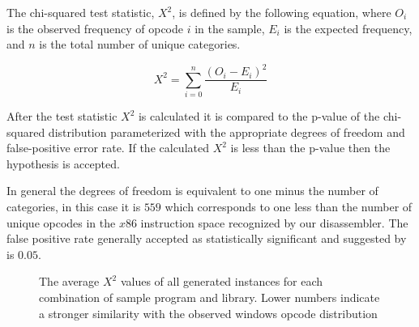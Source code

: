 
    The chi-squared test statistic, $X^2$, is defined by the following
    equation, where $O_i$ is the observed frequency of opcode $i$ in the
    sample, $E_i$ is the expected frequency, and $n$ is the total number of
    unique categories.

    $$X^2 = \sum_{i=0}^{n} \frac{(O_i - E_i)^2}{E_i}$$

    After the test statistic $X^2$ is calculated it is compared to the
    p-value of the chi-squared distribution parameterized with the
    appropriate degrees of freedom and false-positive error rate. If the
    calculated $X^2$ is less than the p-value then the hypothesis is
    accepted.

    In general the degrees of freedom is equivalent to one minus the number of
    categories, in this case it is $559$ which corresponds to one less than the
    number of unique opcodes in the $x86$ instruction space recognized by our
    disassembler. The false positive rate generally accepted as statistically
    significant and suggested by \cite{chisquared} is $0.05$.

    \begin{figure}[t!]
        \vspace{-50pt}
        \caption[Results for blending in with benign programs]
        {The average $X^2$ values of all generated instances for each
        combination of sample program and library. Lower numbers indicate a
        stronger similarity with the observed windows opcode distribution}
        \label{tab:results-windows-like-avg}
    \end{figure}

